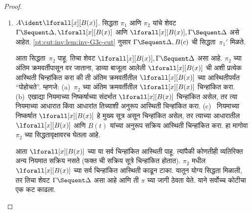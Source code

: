 \begin{proof}
\begin{enumerate}
  $\Gamma \Sequent \Delta, B$ ची
  सिद्धता $\pi_2'$ आणि
  $C, \Gamma \Sequent \Delta$ ची
  सिद्धता $\pi_2''$ मिळते.
  \ref{pt:seq:adm:prop:weak-G3c-adm}
  हे $\pi_2''$ ला लावल्यास
  $C, B, \Gamma \Sequent \Delta$
  ची सिद्धता~$\pi_2'''$ मिळते.
  सिद्धता~$\pi'$ पुढीलप्रमाणे आहे:
  \[
  \AxiomC{}
  \RightLabel{$\pi_2'$}
  \Deduce$\Gamma \fCenter \Delta, B$
  \AxiomC{}
  \RightLabel{$\pi_1'$}
  \Deduce$B, \Gamma \fCenter \Delta, C$
  \AxiomC{}
  \RightLabel{$\pi_2'''$}
  \Deduce$C, B, \Gamma \fCenter \Delta$
  \RightLabel{\CutCS}
  \BinaryInf$B, \Gamma \fCenter \Delta$
  \RightLabel{\CutCS}
  \BinaryInf$\Gamma \fCenter \Delta$
  \DisplayProof
  \]
  \item $A \ident \lforall[x][B(x)]$.
  सिद्धता $\pi_1$ आणि $\pi_2$
  यांचे शेवट
  $\Gamma \Sequent \Delta, \lforall[x][B(x)]$
  आणि $\lforall[x][B(x)], \Gamma \Sequent \Delta$
  असे आहेत. \ref{pt:cut:inv:lem:inv-G3c-cut} नुसार
  $\Gamma \Sequent \Delta, B(c)$ ची
  सिद्धता~$\pi_1'$ मिळते.

आता सिद्धता~$\pi_2$ पाहू. तिचा शेवट
$\lforall[x][B(x)], \Gamma \Sequent \Delta$
असा आहे. $\pi_2$ च्या अंतिम क्रमवर्तीपासून
वर जाताना, डाव्या बाजूला आलेली
$\lforall[x][B(x)]$ ची अशी प्रत्येक आस्थिती
चिन्हांकित करा की ती अंतिम क्रमवर्तीतील
$\lforall[x][B(x)]$ च्या आस्थितीपर्यंत
“पोहोचते”. म्हणजे:
(a)~$\pi_2$ च्या अंतिम क्रमवर्तीतील
$\lforall[x][B(x)]$ चिन्हांकित करा.
(b)~एखाद्या नियमाच्या निष्कर्षाच्या
संदर्भात $\lforall[x][B(x)]$ चिन्हांकित
असेल, तर त्या नियमाच्या आधारात किंवा
आधारांत तिच्याशी अनुरूप आस्थिती चिन्हांकित
करा. (c)~\LeftR{\lforall} नियमाच्या
निष्कर्षात $\lforall[x][B(x)]$ हे मुख्य
सूत्र असून चिन्हांकित असेल, तर त्याच्या
आधारातील $\lforall[x][B(x)]$ आणि
$B(t)$ यांच्या अनुरूप सक्रिय आस्थिती
चिन्हांकित करा. हा मागोवा $\pi_2$
च्या सिद्धतावृक्षावरच घेतला आहे.

आता $\lforall[x][B(x)]$ च्या
या सर्व चिन्हांकित आस्थिती पाहू. त्यांपैकी
कोणतीही \LeftR{\lforall} व्यतिरिक्त
अन्य नियमात सक्रिय नसते
(फक्त \LeftR{\lforall} ची सक्रिय
सूत्रे चिन्हांकित होतात).
$\pi_2$ मधील $\lforall[x][B(x)]$
च्या सर्व चिन्हांकित आस्थिती काढून टाका.
यातून योग्य सिद्धता मिळाली, तर तिचा शेवट
$\Gamma \Sequent \Delta$ असा आहे आणि
ती $\pi$ च्या जागी ठेवता येते.
याने सर्वोच्च कोटीचा एक कट काढला.


\end{enumerate}
\end{proof}
